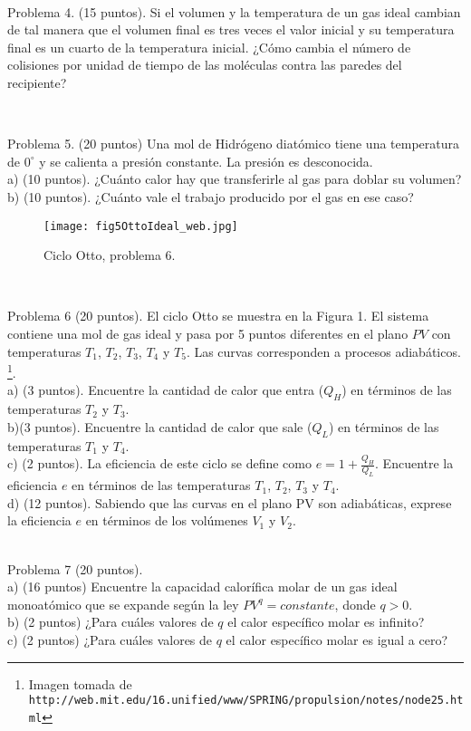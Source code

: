\documentclass{article}
\begin{document}
\

Problema 4. (15 puntos). Si el volumen y la temperatura de un gas ideal
cambian de tal manera que el volumen final es tres veces el valor inicial y
su temperatura final es un cuarto de la temperatura inicial. ¿C\'omo cambia el n\'umero de colisiones por unidad de tiempo de las mol\'eculas contra las paredes del recipiente? 

\

Problema 5. (20 puntos) Una mol de Hidr\'ogeno diat\'omico tiene una
temperatura de $0^{\circ}$ y se calienta a presi\'on constante. La
presi\'on es desconocida.\\
%
a) (10 puntos). ¿Cu\'anto calor hay que transferirle al gas para doblar su volumen?\\
b) (10 puntos). ¿Cu\'anto vale el trabajo producido por el gas en ese caso?\\


\begin{wrapfigure}{l}{0.5\textwidth}
\begin{center}
\texttt{[image: fig5OttoIdeal\_web.jpg]}
\end{center}
\caption{Ciclo Otto, problema 6.}
\end{wrapfigure} 


\

Problema 6 (20 puntos). El ciclo Otto se muestra en la Figura 1. El
sistema contiene una mol de gas ideal y pasa por 5 puntos diferentes
en el plano $PV$ con temperaturas $T_1$, $T_2$, $T_3$, $T_4$ y
$T_5$.
  Las curvas corresponden a procesos adiab\'aticos. \footnote{Imagen
    tomada de
    \verb"http://web.mit.edu/16.unified/www/SPRING/propulsion/notes/node25.html"}. \\
a) (3 puntos). Encuentre la cantidad de calor que entra ($Q_H$) en t\'erminos de las
  temperaturas $T_2$ y $T_3$.\\
b)(3 puntos). Encuentre la cantidad de calor que sale ($Q_L$) en t\'erminos de las
  temperaturas $T_1$ y $T_4$.\\
c) (2 puntos). La eficiencia de este ciclo se define como $e =
  1+\frac{Q_H}{Q_{L}}$. Encuentre la eficiencia $e$ en t\'erminos de las
  temperaturas $T_1$, $T_2$, $T_3$ y $T_4$.\\
d) (12 puntos). Sabiendo que las curvas en el plano PV son adiab\'aticas,
  exprese la eficiencia $e$ en t\'erminos de los vol\'umenes $V_1$ y
  $V_2$. \\



\

Problema 7 (20 puntos).\\
a) (16 puntos) Encuentre la capacidad calor\'ifica molar de un gas
ideal monoat\'omico que se expande seg\'un la ley $PV^{q}=constante$,
donde $q>0$.\\
b) (2 puntos) ¿Para cu\'ales valores de $q$ el calor espec\'ifico molar es infinito?\\
c) (2 puntos) ¿Para cu\'ales valores de $q$ el calor espec\'ifico molar es igual a cero?  \\
\end{document}
